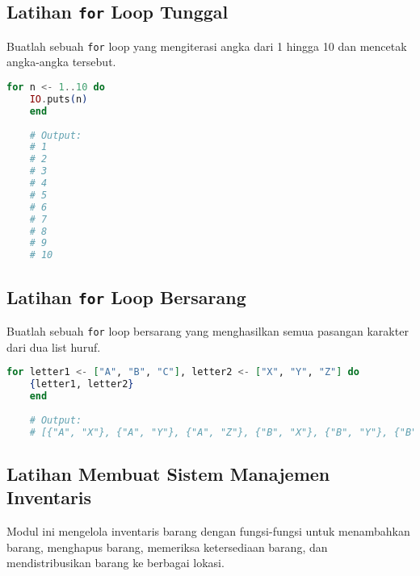 \subsection{Latihan \texttt{for} Loop Tunggal}

Buatlah sebuah \texttt{for} loop yang mengiterasi angka dari 1 hingga 10 dan mencetak angka-angka tersebut.

\begin{lstlisting}[language=Elixir]
	for n <- 1..10 do
	IO.puts(n)
	end
	
	# Output:
	# 1
	# 2
	# 3
	# 4
	# 5
	# 6
	# 7
	# 8
	# 9
	# 10
\end{lstlisting}

\subsection{Latihan \texttt{for} Loop Bersarang}

Buatlah sebuah \texttt{for} loop bersarang yang menghasilkan semua pasangan karakter dari dua list huruf.


\begin{lstlisting}[language=Elixir]
	for letter1 <- ["A", "B", "C"], letter2 <- ["X", "Y", "Z"] do
	{letter1, letter2}
	end
	
	# Output:
	# [{"A", "X"}, {"A", "Y"}, {"A", "Z"}, {"B", "X"}, {"B", "Y"}, {"B", "Z"}, {"C", "X"}, {"C", "Y"}, {"C", "Z"}]
\end{lstlisting}

\subsection{Latihan Membuat Sistem Manajemen Inventaris}

Modul ini mengelola inventaris barang dengan fungsi-fungsi untuk menambahkan barang, menghapus barang, memeriksa ketersediaan barang, dan mendistribusikan barang ke berbagai lokasi.

